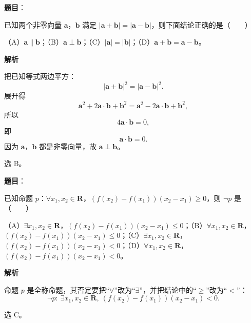 \begin{answer}

\textbf{题目}：

已知两个非零向量 $\boldsymbol a$，$\boldsymbol b$ 满足 $|\boldsymbol a+\boldsymbol b|=|\boldsymbol a-\boldsymbol b|$，则下面结论正确的是\mbox{（　　）}

（A）$\boldsymbol a\parallel\boldsymbol b$；（B）$\boldsymbol a\perp\boldsymbol b$；（C）$|\boldsymbol a|=|\boldsymbol b|$；（D）$\boldsymbol a+\boldsymbol b=\boldsymbol a-\boldsymbol b$。

\textbf{解析}

把已知等式两边平方：
\nopagebreak[4]
\[|\boldsymbol a+\boldsymbol b|^2=|\boldsymbol a-\boldsymbol b|^2.\]
展开得
\nopagebreak[4]
\[\boldsymbol a^2+2\boldsymbol a\cdot\boldsymbol b+\boldsymbol b^2
=\boldsymbol a^2-2\boldsymbol a\cdot\boldsymbol b+\boldsymbol b^2,\]
所以
\nopagebreak[4]
\[4\boldsymbol a\cdot\boldsymbol b=0,\]
即
\nopagebreak[4]
\[\boldsymbol a\cdot\boldsymbol b=0.\]
因为 $\boldsymbol a$，$\boldsymbol b$ 都是非零向量，故 $\boldsymbol a\perp\boldsymbol b$。

选 B。


\end{answer}
\begin{answer}

\textbf{题目}：

已知命题 $p$：$\forall x_1,x_2\in\mathbf R$，$(f(x_2)-f(x_1))(x_2-x_1)\geqslant 0$，则 $\neg p$ 是\mbox{（　　）}

（A）$\exists x_1,x_2\in\mathbf R$，$(f(x_2)-f(x_1))(x_2-x_1)\leqslant 0$；（B）$\forall x_1,x_2\in\mathbf R$，$(f(x_2)-f(x_1))(x_2-x_1)\leqslant 0$；（C）$\exists x_1,x_2\in\mathbf R$，$(f(x_2)-f(x_1))(x_2-x_1)<0$；（D）$\forall x_1,x_2\in\mathbf R$，$(f(x_2)-f(x_1))(x_2-x_1)<0$。

\textbf{解析}

命题 $p$ 是全称命题，其否定要把“$\forall$”改为“$\exists$”，并把结论中的“$\geqslant$”改为“$<$”：
\nopagebreak[4]
\[\neg p:\ \exists x_1,x_2\in\mathbf R,\ (f(x_2)-f(x_1))(x_2-x_1)<0.\]

选 C。


\end{answer}
